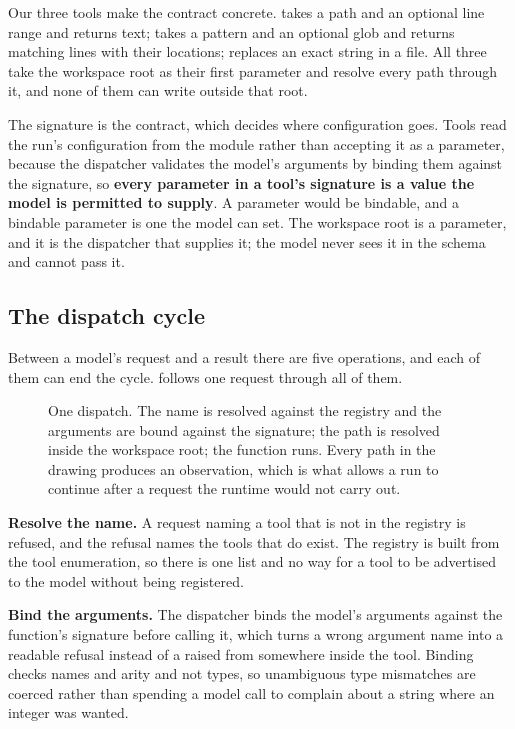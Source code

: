 Our three tools make the contract concrete.  takes a path and an optional line
range and returns text;  takes a pattern and an optional glob and returns matching
lines with their locations;  replaces an exact string in a file. All three take the
workspace root as their first parameter and resolve every path through it, and none of them can
write outside that root.

The signature is the contract, which decides where configuration goes. Tools read the run's
configuration from the module rather than accepting it as a parameter, because the dispatcher
validates the model's arguments by binding them against the signature, so \textbf{every parameter
in a tool's signature is a value the model is permitted to supply}. A  parameter
would be bindable, and a bindable parameter is one the model can set. The workspace root is a
parameter, and it is the dispatcher that supplies it; the model never sees it in the schema and
cannot pass it.

\subsection{The dispatch cycle}
\label{sec:boundary-dispatch}

Between a model's request and a result there are five operations, and each of them can end the
cycle.  follows one request through all of them.

\begin{figure}[htbp]
  \centering
  
  \caption{One dispatch. The name is resolved against the registry and the arguments are bound
  against the signature; the path is resolved inside the workspace root; the function runs. Every
  path in the drawing produces an observation, which is what allows a run to continue after a
  request the runtime would not carry out.}
  \label{fig:dispatch-cycle}
\end{figure}

\bi

\item \textbf{Resolve the name.} A request naming a tool that is not in the registry is refused, and
the refusal names the tools that do exist. The registry is built from the tool enumeration, so
there is one list and no way for a tool to be advertised to the model without being registered.

\item \textbf{Bind the arguments.} The dispatcher binds the model's arguments against the function's
signature before calling it, which turns a wrong argument name into a readable refusal instead of a
 raised from somewhere inside the tool. Binding checks names and arity and not
types, so unambiguous type mismatches are coerced rather than spending a model call to complain
about a string where an integer was wanted.

